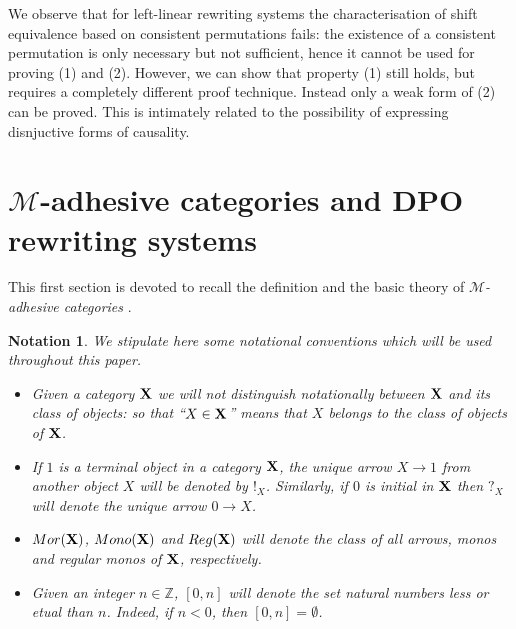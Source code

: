 \documentclass[a4paper,UKenglish,cleveref,pdftex, thm-restate,numberwithinsect]{lipics}
\newcommand{\mor}{\mathsf{Mor}}
\newcommand{\mon}{\mathsf{Mono}}
\newcommand{\reg}{\mathsf{Reg}}
\def\X{\textbf {\textup{X}}}
\def\Set{\textbf {\textup{Set}}}
\newtheorem*{notation}{Notation}
\begin{document}
We observe that for left-linear rewriting systems the characterisation of
shift equivalence based on consistent permutations fails: the
existence of a consistent permutation is only necessary but not
sufficient, hence it cannot be used for proving (1) and (2). However, we can show that property (1) still holds, but requires a completely different proof technique. Instead only a weak form of (2) can be proved. This is intimately related to the possibility of expressing disnjuctive forms of causality.




\section{$\mathcal{M}$-adhesive categories and DPO rewriting systems}\label{sec:ade}

This first section is devoted to recall the definition and the basic theory of \emph{$\mathcal{M}$-adhesive categories} \cite{azzi2019essence,ehrig2012,ehrig2014adhesive,lack2005adhesive}. 

\begin{notation} 
We stipulate here some notational conventions which will be used throughout this paper. 
\begin{itemize}\item 
	Given a category $\X$ we will not distinguish notationally between $\X$ and its class of objects: so that ``$X\in \X$'' means that $X$ belongs to the class of objects of $\X$.  
	\item 
	If $1$ is a terminal object in a category $\X$,  the unique arrow $X\to 1$ from another object $X$ will be denoted by $!_X$. Similarly, if $0$ is initial in $\X$ then $?_X$ will denote the unique arrow $0\to X$. %
	\item  $\mor(\X)$, $\mon(\X)$ and $\reg(\X)$ will denote the class of all arrows, monos and regular monos of $\X$, respectively.
	
	\item Given an integer $n\in \mathbb{Z}$, $[0,n]$ will denote the set natural numbers less or etual than $n$.
	Indeed, if $n<0$, then $[0,n]=\emptyset$.
\end{itemize}
\end{notation}
\end{document}
